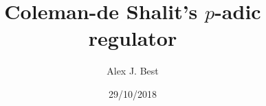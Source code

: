 
\beamertemplatenavigationsymbolsempty

\usepackage{amsmath, amssymb, amsfonts, tikz}
\usepackage[utf8]{inputenc}
\usepackage[T1]{fontenc}
\usepackage[english]{babel}

\usepackage{amsthm}
\theoremstyle{plain}
\newtheorem{theorem}{Theorem}[section]
\newtheorem{corollary}[theorem]{Corollary}
\newtheorem{lemma}[theorem]{Lemma}
\newtheorem{algorithm}[theorem]{Algorithm}
\newtheorem{proposition}[theorem]{Proposition}
\newtheorem{claim}[theorem]{Claim}
\newtheorem{fact}[theorem]{Fact}
\newtheorem{conjecture}[theorem]{Conjecture}
\theoremstyle{definition}
\newtheorem{definition}[theorem]{Definition}
\theoremstyle{definition}
\newtheorem{remark}[theorem]{Remark}
\newtheorem{observation}[theorem]{Observation}
\theoremstyle{definition}
\newtheorem{example}[theorem]{Example}
\newtheorem{question}[theorem]{Question}
\newcommand{\terminology}[1]{\textbf{#1}}

\newcommand{\NN}{\mathbf{N}}
\newcommand{\ZZ}{\mathbf{Z}}
\newcommand{\QQ}{\mathbf Q}
\newcommand{\CC}{\mathbf C}
\newcommand{\RR}{\mathbf R}
\newcommand{\FF}{\mathbf F}
\newcommand{\lt}{<}
\newcommand{\gt}{>}
\newcommand{\amp}{&}
\newcommand{\diff}{\mathop{}\!\mathrm{d}}
\newcommand{\ints}{\mathcal{O}}
\newcommand{\ideal}[1]{\mathfrak{#1}}
\usepackage{mathrsfs}\usepackage{cancel}
\newcommand{\Gal}[2]{\operatorname{Gal}(#1/#2)}
\newcommand{\absgal}[1]{\operatorname{Gal}(\overline{#1}/#1)}

\newcommand{\sheaf}[1]{\operatorname{\mathcal{#1}}}
\newcommand{\inv}{^{-1}}
\DeclareMathOperator{\norm}{Nm}
\DeclareMathOperator{\ord}{ord}
\DeclareMathOperator{\divisor}{div}
\DeclareMathOperator{\PP}{\mathbf{P}}
\DeclareMathOperator{\Hom}{Hom}

\newcommand{\lb}{[}
\newcommand{\rb}{]}

\author{Alex J. Best}
\date{29/10/2018}
\title{Coleman-de Shalit's $p$-adic regulator}



\begin{frame}
  \titlepage

\end{frame}

